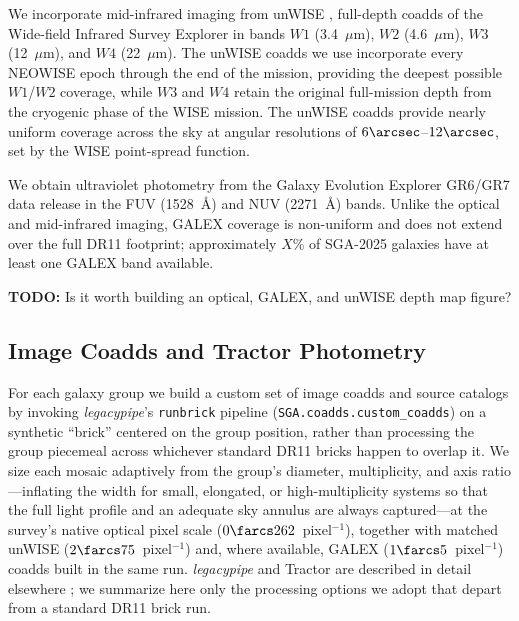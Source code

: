 \documentclass[modern,linenumbers]{aastex701}
\newcommand{\todo}[1]{{\color{red}\textbf{TODO:} #1}}
\begin{document}
We incorporate mid-infrared imaging from unWISE \citep{lang14a,
  meisner21a}, full-depth coadds of the Wide-field Infrared Survey
Explorer \citep[WISE;][]{wright10a} in bands $W1$ (3.4~$\mu$m), $W2$
(4.6~$\mu$m), $W3$ (12~$\mu$m), and $W4$ (22~$\mu$m). The unWISE
coadds we use incorporate every NEOWISE epoch through the end of the
mission, providing the deepest possible $W1$/$W2$ coverage, while $W3$
and $W4$ retain the original full-mission depth from the cryogenic
phase of the WISE mission. The unWISE coadds provide nearly uniform
coverage across the sky at angular resolutions of
$6\arcsec$--$12\arcsec$, set by the WISE point-spread function.


We obtain ultraviolet photometry from the Galaxy Evolution Explorer
\citep[GALEX;][]{martin05a} GR6/GR7 data release in the FUV (1528~\AA{})
and NUV (2271~\AA{}) bands. Unlike the optical and mid-infrared imaging,
GALEX coverage is non-uniform and does not extend over the full DR11
footprint; approximately $X$\% of SGA-2025 galaxies have at least one
GALEX band available.

\todo{Is it worth building an optical, GALEX, and unWISE depth map figure?}

\subsection{Image Coadds and Tractor Photometry}
\label{sec:pipeline:tractor}

For each galaxy group we build a custom set of image coadds and source
catalogs by invoking \textsl{legacypipe}'s \texttt{runbrick} pipeline
(\texttt{SGA.coadds.custom\_coadds}) on a synthetic ``brick'' centered on
the group position, rather than processing the group piecemeal across
whichever standard DR11 bricks happen to overlap it. We size each
mosaic adaptively from the group's diameter, multiplicity, and axis
ratio---inflating the width for small, elongated, or high-multiplicity
systems so that the full light profile and an adequate sky annulus are
always captured---at the survey's native optical pixel scale
($0\farcs262$~pixel$^{-1}$), together with matched unWISE
($2\farcs75$~pixel$^{-1}$) and, where available, GALEX
($1\farcs5$~pixel$^{-1}$) coadds built in the same run. \textsl{legacypipe}
and Tractor \citep{lang16a} are described in detail elsewhere
\citep{dey19a,moustakas23a}; we summarize here only the processing
options we adopt that depart from a standard DR11 brick run.
\end{document}
